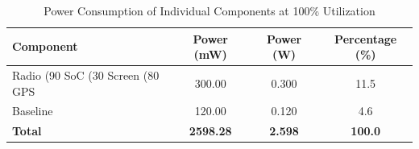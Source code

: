 \begin{table}[htbp]
\centering
\caption{Power Consumption of Individual Components at 100\% Utilization}
\label{tab:component_power}
\begin{tabular}{lccc}
\hline
Component & Power (mW) & Power (W) & Percentage (\%) \\
\hline
Radio (90%
SoC (30%
Screen (80%
GPS & 300.00 & 0.300 & 11.5 \\
Baseline & 120.00 & 0.120 & 4.6 \\
\hline
\textbf{Total} & \textbf{2598.28} & \textbf{2.598} & \textbf{100.0} \\
\hline
\end{tabular}
\end{table}
